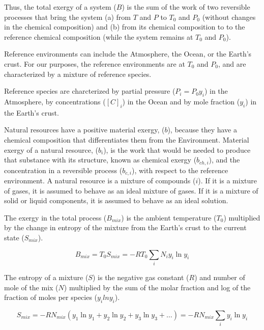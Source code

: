 \documentclass[energies,article,submit,pdftex,moreauthors]{Definitions/mdpi}
\begin{document}
Thus, the total exergy of a system ($B$)
is the sum of the work of two reversible processes
that bring the system
(a) from $T$ and $P$ to
$T_{0}$ and $P_{0}$
(without changes in the chemical composition) and
(b) from its chemical composition to
to the reference chemical composition
(while the system remains at $T_{0}$ and $P_{0}$).


Reference environments can include the Atmosphere,
the Ocean, or the Earth's crust.
For our purposes,
the reference environments are at $T_{0}$ and $P_{0}$,
and are characterized by a mixture of reference species.

Reference species are charcterized by partial pressure
($P_{i} = P_{0} y_{i}$) in the Atmosphere,
by concentrations ($[C]_{i}$) in the Ocean
and by mole fraction ($y_{i}$)
in the Earth's crust.


Natural resources have a positive material exergy, ($b$),
because they have a chemical composition
that differentiates them from the Environment.
Material exergy of a natural resource, ($b_{i}$),
is the work that would be needed
to produce that substance with its structure,
known as chemical exergy ($b_{ch,i}$),
and the concentration in a reversible process ($b_{c,i}$),
with respect to the reference environment.
A natural resource is a mixture of compounds ($i$).
If it is a mixture of gases,
it is assumed to behave as an ideal mixture of gases.
If it is a mixture of solid or liquid components,
it is assumed to behave as an ideal solution.

The exergy in the total process ($B_{mix}$) is the ambient temperature ($T_{0}$) multiplied by the change
in entropy of the mixture from the Earth's crust to the current state ($S_{mix}$).

\begin{equation}\label{eq:specific_exergy_of_mixture_definition1}
  B_{mix} = T_{0}S_{mix} = -RT_{0}\sum_{i}{N_{i}{y_{i}}\ln{y_{i}}}
\end{equation}

The entropy of a mixture ($S$) is the negative gas constant ($R$)
and number of mole of the mix ($N$)
multiplied by the sum of the molar fraction
and log of the fraction of moles per species ($y_i$$lny_i$).

\begin{equation}\label{eq:specific_entropy_of_mixture_definition}
  S_{mix} = -RN_{mix}(y_{1}\ln{y_{1}} + y_{2}\ln{y_{2}} + y_{3}\ln{y_{3}} + \ldots)
          = -RN_{mix}\sum_{i} y_{i}\ln{y_{i}}
\end{equation}
\end{document}
